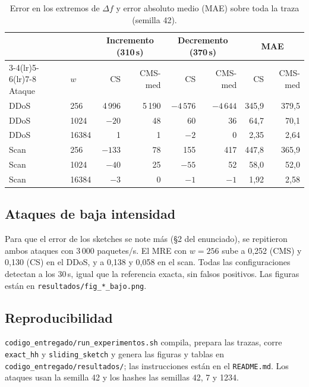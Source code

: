 \documentclass[11pt]{article}
\newcommand{\code}[1]{\texttt{#1}}
\begin{document}
\begin{table}[H]
\centering\small
\caption{Error en los extremos de $\Delta f$ y error absoluto medio (MAE) sobre toda la traza (semilla 42).}
\label{tab:delta}
\begin{tabular}{llrrrrrr}
\toprule
 & & \multicolumn{2}{c}{Incremento (310\,s)} & \multicolumn{2}{c}{Decremento (370\,s)} & \multicolumn{2}{c}{MAE} \\
\cmidrule(lr){3-4}\cmidrule(lr){5-6}\cmidrule(lr){7-8}
Ataque & $w$ & CS & CMS-med & CS & CMS-med & CS & CMS-med \\
\midrule
DDoS & 256   & 4\,996 & 5\,190 & $-4\,576$ & $-4\,644$ & 345,9 & 379,5 \\
DDoS & 1024  & $-20$  & 48     & 60        & 36        & 64,7  & 70,1 \\
DDoS & 16384 & 1      & 1      & $-2$      & 0         & 2,35  & 2,64 \\
\addlinespace
Scan & 256   & $-133$ & 78     & 155       & 417       & 447,8 & 365,9 \\
Scan & 1024  & $-40$  & 25     & $-55$     & 52        & 58,0  & 52,0 \\
Scan & 16384 & $-3$   & 0      & $-1$      & $-1$      & 1,92  & 2,58 \\
\bottomrule
\end{tabular}
\end{table}

\subsection{Ataques de baja intensidad}

Para que el error de los sketches se note más (§2 del enunciado), se repitieron ambos ataques con 3\,000 paquetes/s. El MRE con $w=256$ sube a 0,252 (CMS) y 0,130 (CS) en el DDoS, y a 0,138 y 0,058 en el scan. Todas las configuraciones detectan a los 30\,s, igual que la referencia exacta, sin falsos positivos. Las figuras están en \code{resultados/fig\_*\_bajo.png}.

\subsection{Reproducibilidad}

\code{codigo\_entregado/run\_experimentos.sh} compila, prepara las trazas, corre \code{exact\_hh} y \code{sliding\_sketch} y genera las figuras y tablas en \code{codigo\_entregado/resultados/}; las instrucciones están en el \code{README.md}. Los ataques usan la semilla 42 y los hashes las semillas 42, 7 y 1234.
\end{document}
